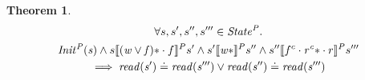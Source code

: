 \documentclass[a4paper,11pt]{article}
\newtheorem{theorem}{Theorem}[section]
\theoremstyle{definition}
\begin{document}
\begin{theorem}
\begin{multline*}
      \forall s, s', s'', s''' \in \mathit{State^P} \ldotp\\\mathit{Init^P(s)} \land s \llbracket \mathit{(w \lor f)\ast} \cdot f \rrbracket^P s' \land
      s' \llbracket \mathit{w\ast} \rrbracket^P s'' \land
      s'' \llbracket f^c \cdot \mathit{r^c\ast} \cdot r \rrbracket^P s'''\\
      \implies \mathit{read(s')} \doteq \mathit{read(s''')} \lor \mathit{read(s'')} \doteq \mathit{read(s''')}
\end{multline*}
\end{theorem}
\end{document}
